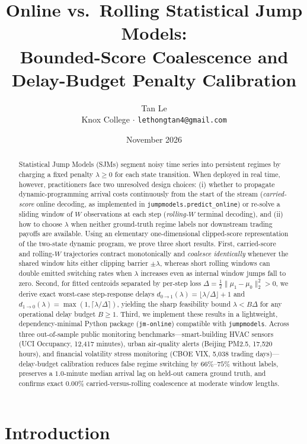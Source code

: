 \documentclass[11pt]{article}
\title{\textbf{Online vs.\ Rolling Statistical Jump Models:\\
Bounded-Score Coalescence and Delay-Budget Penalty Calibration}}
\author{Tan Le\\[3pt]
\small Knox College $\cdot$ \texttt{lethongtan4@gmail.com}}
\date{November 2026}
\begin{document}
\maketitle

\begin{abstract}
Statistical Jump Models (SJMs) segment noisy time series into persistent regimes by charging a fixed penalty $\lambda \ge 0$ for each state transition. When deployed in real time, however, practitioners face two unresolved design choices: (i) whether to propagate dynamic-programming arrival costs continuously from the start of the stream (\emph{carried-score} online decoding, as implemented in \texttt{jumpmodels.predict\_online}) or re-solve a sliding window of $W$ observations at each step (\emph{rolling-$W$} terminal decoding), and (ii) how to choose $\lambda$ when neither ground-truth regime labels nor downstream trading payoffs are available. Using an elementary one-dimensional clipped-score representation of the two-state dynamic program, we prove three short results. First, carried-score and rolling-$W$ trajectories contract monotonically and \emph{coalesce identically} whenever the shared window hits either clipping barrier $\pm\lambda$, whereas short rolling windows can double emitted switching rates when $\lambda$ increases even as internal window jumps fall to zero. Second, for fitted centroids separated by per-step loss $\Delta = \frac{1}{2}\|\mu_1 - \mu_0\|_2^2 > 0$, we derive exact worst-case step-response delays $d_{0\to 1}(\lambda) = \lfloor \lambda/\Delta \rfloor + 1$ and $d_{1\to 0}(\lambda) = \max(1, \lceil \lambda/\Delta \rceil)$, yielding the sharp feasibility bound $\lambda < B\Delta$ for any operational delay budget $B \ge 1$. Third, we implement these results in a lightweight, dependency-minimal Python package (\texttt{jm-online}) compatible with \texttt{jumpmodels}. Across three out-of-sample public monitoring benchmarks---smart-building HVAC sensors (UCI Occupancy, 12,417 minutes), urban air-quality alerts (Beijing PM2.5, 17,520 hours), and financial volatility stress monitoring (CBOE VIX, 5,038 trading days)---delay-budget calibration reduces false regime switching by $66\%$--$75\%$ without labels, preserves a $1.0$-minute median arrival lag on held-out camera ground truth, and confirms exact $0.00\%$ carried-versus-rolling coalescence at moderate window lengths.
\end{abstract}

\section{Introduction}
\end{document}
